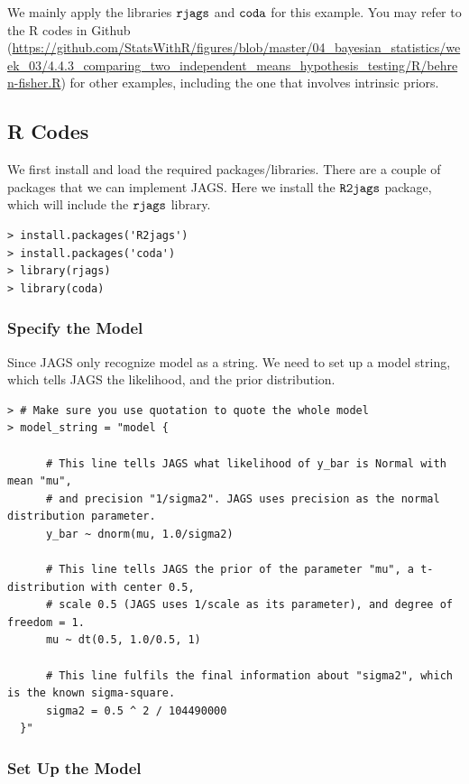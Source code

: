 \documentclass{article}
\begin{document}
We mainly apply the libraries $\verb|rjags|$ and $\verb|coda|$ for this example. You may refer to the R codes in Github (\url{https://github.com/StatsWithR/figures/blob/master/04_bayesian_statistics/week_03/4.4.3_comparing_two_independent_means_hypothesis_testing/R/behren-fisher.R}) for other examples, including the one that involves intrinsic priors. 

\subsection{R Codes}

We first install and load the required packages/libraries. There are a couple of packages that we can implement JAGS. Here we install the $\verb|R2jags|$ package, which will include the $\verb|rjags|$ library.
\begin{lstlisting}
> install.packages('R2jags')
> install.packages('coda')
> library(rjags)
> library(coda)
\end{lstlisting}

\subsubsection*{Specify the Model}

Since JAGS only recognize model as a string. We need to set up a model string, which tells JAGS the likelihood, and the prior distribution. 

\begin{lstlisting}
> # Make sure you use quotation to quote the whole model
> model_string = "model {

      # This line tells JAGS what likelihood of y_bar is Normal with mean "mu", 
      # and precision "1/sigma2". JAGS uses precision as the normal distribution parameter.   
      y_bar ~ dnorm(mu, 1.0/sigma2)       
      
      # This line tells JAGS the prior of the parameter "mu", a t-distribution with center 0.5,
      # scale 0.5 (JAGS uses 1/scale as its parameter), and degree of freedom = 1.
      mu ~ dt(0.5, 1.0/0.5, 1)
      
      # This line fulfils the final information about "sigma2", which is the known sigma-square.
      sigma2 = 0.5 ^ 2 / 104490000
  }"
\end{lstlisting} 

\subsubsection*{Set Up the Model}
 
\end{document}
